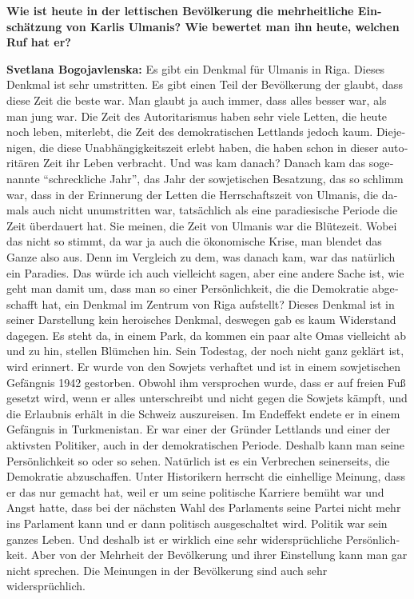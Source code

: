\begin{otherlanguage}{ngerman}
\textbf{Wie ist heute in der lettischen Bevölkerung die mehrheitliche Einschätzung von Karlis Ulmanis? Wie bewertet man ihn heute, welchen Ruf hat er?}

\textbf{Svetlana Bogojavlenska:} Es gibt ein Denkmal für Ulmanis in Riga. Dieses Denkmal ist sehr umstritten. Es gibt einen Teil der Bevölkerung der glaubt, dass diese Zeit die beste war. Man glaubt ja auch immer, dass alles besser war, als man jung war. Die Zeit des Autoritarismus haben sehr viele Letten, die heute noch leben, miterlebt, die Zeit des demokratischen Lettlands jedoch kaum. Diejenigen, die diese Unabhängigkeitszeit erlebt haben, die haben schon in dieser autoritären Zeit ihr Leben verbracht. Und was kam danach? Danach kam das sogenannte "`schreckliche Jahr"', das Jahr der sowjetischen Besatzung, das so schlimm war, dass in der Erinnerung der Letten die Herrschaftszeit von Ulmanis, die damals auch nicht unumstritten war, tatsächlich als eine paradiesische Periode die Zeit überdauert hat. Sie meinen, die Zeit von Ulmanis war die Blütezeit. Wobei das nicht so stimmt, da war ja auch die ökonomische Krise, man blendet das Ganze also aus. Denn im Vergleich zu dem, was danach kam, war das natürlich ein Paradies. Das würde ich auch vielleicht sagen, aber eine andere Sache ist, wie geht man damit um, dass man so einer Persönlichkeit, die die Demokratie abgeschafft hat, ein Denkmal im Zentrum von Riga aufstellt? Dieses Denkmal ist in seiner Darstellung kein heroisches Denkmal, deswegen gab es kaum Widerstand dagegen. Es steht da, in einem Park, da kommen ein paar alte Omas vielleicht ab und zu hin, stellen Blümchen hin. Sein Todestag, der noch nicht ganz geklärt ist, wird erinnert. Er wurde von den Sowjets verhaftet und ist in einem sowjetischen Gefängnis 1942 gestorben. Obwohl ihm versprochen wurde, dass er auf freien Fuß gesetzt wird, wenn er alles unterschreibt und nicht gegen die Sowjets kämpft, und die Erlaubnis erhält in die Schweiz auszureisen. Im Endeffekt endete er in einem Gefängnis in Turkmenistan. Er war einer der Gründer Lettlands und einer der aktivsten Politiker, auch in der demokratischen Periode. Deshalb kann man seine Persönlichkeit so oder so sehen. Natürlich ist es ein Verbrechen seinerseits, die Demokratie abzuschaffen. Unter Historikern herrscht die einhellige Meinung, dass er das nur gemacht hat, weil er um seine politische Karriere bemüht war und Angst hatte, dass bei der nächsten Wahl des Parlaments seine Partei nicht mehr ins Parlament kann und er dann politisch ausgeschaltet wird. Politik war sein ganzes Leben. Und deshalb ist er wirklich eine sehr widersprüchliche Persönlichkeit. Aber von der Mehrheit der Bevölkerung und ihrer Einstellung kann man gar nicht sprechen. Die Meinungen in der Bevölkerung sind auch sehr widersprüchlich.


\end{otherlanguage}
